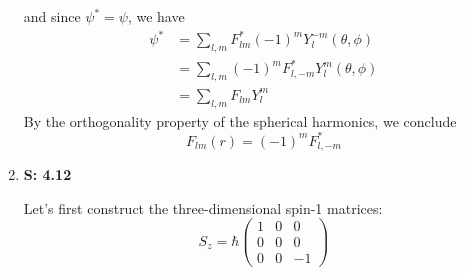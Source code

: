 \documentclass[12pt, letterpaper]{article}
\begin{document}
\begin{enumerate}
    and since $\psi^*=\psi$, we have
    \begin{align}
         \psi^*&=\sum_{l,m}F_{lm}^*(-1)^mY_l^{-m}(\theta,\phi)\\&=\sum_{l,m}(-1)^mF^*_{l,-m}Y_l^m(\theta,\phi)\\&=\sum_{l,m}F_{lm}Y_l^m
    \end{align}
    By the orthogonality property of the spherical harmonics, we conclude
    \begin{equation}
        \boxed{F_{lm}(r)=(-1)^m F^*_{l,-m}}
    \end{equation}
    
    \item[] \textbf{S: 4.12}
    
    Let's first construct the three-dimensional spin-1 matrices:
    \begin{equation}
        S_z=\hbar \left(\begin{array}{ccc}1&0&0\\0&0&0\\0&0&-1\end{array}\right)
    \end{equation}
    

\end{enumerate}
\end{document}
